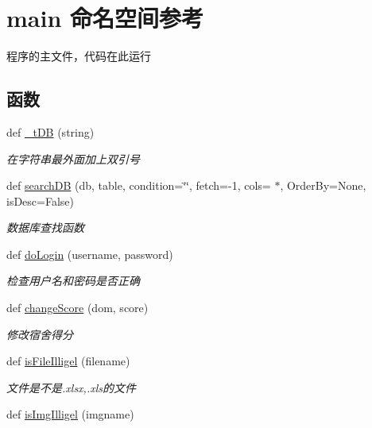 \hypertarget{namespacemain}{}\section{main 命名空间参考}
\label{namespacemain}


程序的主文件，代码在此运行  


\subsection*{函数}
\begin{DoxyCompactItemize}
\item 
def \mbox{\hyperlink{namespacemain_a39677d63980368745619bcd32200e768}{\+\_\+t\+DB}} (string)
\begin{DoxyCompactList}\small\item\em 在字符串最外面加上双引号 \end{DoxyCompactList}\item 
def \mbox{\hyperlink{namespacemain_a8349c6affc6efc18c9afef83fec85e48}{search\+DB}} (db, table, condition=\char`\"{}\char`\"{}, fetch=-\/1, cols=\textquotesingle{} $\ast$\textquotesingle{}, Order\+By=None, is\+Desc=False)
\begin{DoxyCompactList}\small\item\em 数据库查找函数 \end{DoxyCompactList}\item 
def \mbox{\hyperlink{namespacemain_ac89e4341171325314c0685e7f49d8015}{do\+Login}} (username, password)
\begin{DoxyCompactList}\small\item\em 检查用户名和密码是否正确 \end{DoxyCompactList}\item 
def \mbox{\hyperlink{namespacemain_a4f4216d6a8208604c32b24da5feeaf68}{change\+Score}} (dom, score)
\begin{DoxyCompactList}\small\item\em 修改宿舍得分 \end{DoxyCompactList}\item 
def \mbox{\hyperlink{namespacemain_ab4bfdca65955984f28c72a5d0daec565}{is\+File\+Illigel}} (filename)
\begin{DoxyCompactList}\small\item\em 文件是不是.\+xlsx,.xls的文件 \end{DoxyCompactList}\item 
def \mbox{\hyperlink{namespacemain_a0deb3fcf5caed9b545bb317bc0f2486f}{is\+Img\+Illigel}} (imgname)

\end{DoxyCompactItemize}
